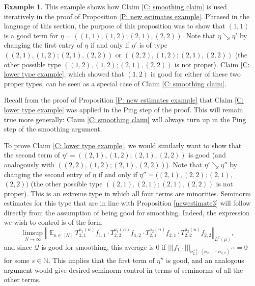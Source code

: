 \documentclass[11pt]{amsart}
\theoremstyle{definition}
\newtheorem{example}[lemma]{Example}
\DeclareMathOperator*{\E}{\mathbb{E}}
\newcommand{\N}{{\mathbb N}}
\newcommand{\CQ}{{\mathcal Q}}
\newcommand{\be}{{\mathbf{e}}}
\newcommand{\norm}[1]{\left\Vert #1\right\Vert}
\newcommand{\nnorm}[1]{\lvert\!|\!| #1|\!|\!\rvert}
\newcommand{\1}{{\mathbf{1}}}
\begin{document}
\begin{example}
    This example shows how Claim \ref{C: smoothing claim} is used iteratively in the proof of Proposition \ref{P: new estimates example}. Phrased in the language of this section, the purpose of this proposition was to show that $(1,1)$ is a good term for $\eta = ((1,1),(1,2);(2,1),(2,2))$. Note that $\eta\searrow\eta'$ by changing the first entry of $\eta$ if and only if $\eta'$ is of type $((2,1),(1,2);(2,1),(2,2))$ or $((2,2),(1,2);(2,1),(2,2))$ (the other possible type $((1,2),(1,2);(2,1),(2,2))$ is not proper). Claim \ref{C: lower type example}, which showed that $(1,2)$ is good for either of these two proper types, can be seen as a special case of Claim \ref{C: smoothing claim}. 
    
    Recall from the proof of Proposition \ref{P: new estimates example} that Claim \ref{C: lower type example} was applied in the Ping step of the proof. This will remain true more generally: Claim \ref{C: smoothing claim} will always turn up in the Ping step of the smoothing argument.

   To prove Claim \ref{C: lower type example}, we would similarly want to show that the second term of $\eta' = ((2,1),(1,2);(2,1),(2,2))$ is good (and analogously with $((2,2),(1,2);(2,1),(2,2))$). Note that  $\eta'\searrow\eta''$ by changing the second entry of $\eta$ if and only if $\eta''=((2,1),(2,2);(2,1),$ $(2,2))$  (the other possible type $((2,1),(2,1);(2,1),(2,2))$ is not proper). This is an extreme type in which all four terms are minorities. Seminorm estimates for this type that are in line with Proposition \ref{newestimate3} will follow directly from the assumption of being good for smoothing.
   Indeed, the expression we wish to control is of the form
   $$\limsup_{N\to\infty}\norm{\E_{n\in [N]} T_{2,1}^{a_{1}(n)} f_{1,1}\cdot T_{2,2}^{a_{1}(n)} f_{1,2}\cdot T_{2,1}^{a_{2}(n)} f_{2,1}\cdot T_{2,2}^{a_{2}(n)} f_{2,2}}_{L^2(\mu)},$$
and since $\CQ$ is good for smoothing, this average is 0 if $\nnorm{f_{1,1}}_{\be_{2,1}^{\times s}, (\be_{2,1}-\be_{2,2})^{\times s}}=0$ for some $s\in\N$. This implies that the first term of $\eta''$ is good, and an analogous argument would give desired seminorm control in terms of seminorms of all the other terms.
\end{example}

\end{document}

